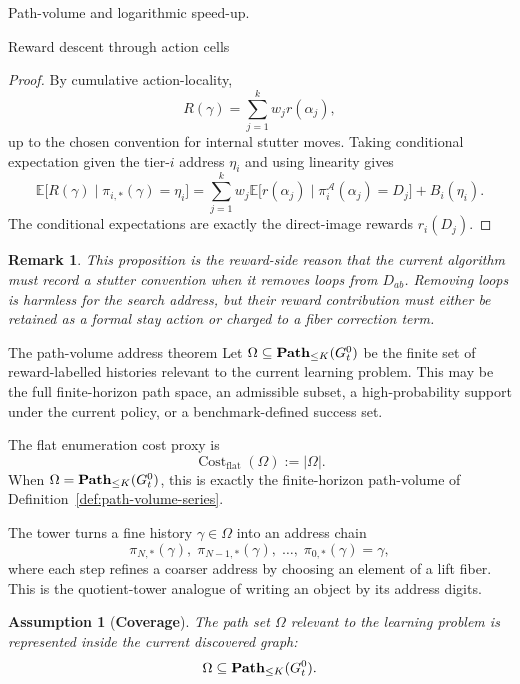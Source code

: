 \documentclass[11pt]{article}
\newtheorem{assumption}[subsubsection]{Assumption}
\newtheorem{remark}[subsubsection]{Remark}
\newcommand{\E}{\mathbb{E}}
\newcommand{\cost}{\operatorname{Cost}}
\begin{document}
\begin{section}{Path-volume and logarithmic speed-up.}
\begin{subsection}{Reward descent through action cells}
\begin{proof}
By cumulative action-locality,
$$
R(\gamma)=\sum_{j=1}^{k}w_jr(\alpha_j),
$$
up to the chosen convention for internal stutter moves. Taking conditional expectation given the tier-$i$ address $\eta_i$ and using linearity gives
$$
\E\bigl[R(\gamma)\mid \pi_{i,*}(\gamma)=\eta_i\bigr]
=
\sum_{j=1}^{k}w_j
\E\bigl[r(\alpha_j)\mid \pi_i^{\mathcal A}(\alpha_j)=D_j\bigr]
+B_i(\eta_i).
$$
The conditional expectations are exactly the direct-image rewards $r_i(D_j)$.
\end{proof}

\begin{remark}
\normalfont
This proposition is the reward-side reason that the current algorithm must record a stutter convention when it removes loops from $D_{ab}$. Removing loops is harmless for the search address, but their reward contribution must either be retained as a formal stay action or charged to a fiber correction term.
\end{remark}

\end{subsection}

\begin{subsection}{The path-volume address theorem}
\label{thm:path-volume-address}
Let
$
\Omega\subseteq\bold{Path}_{\le K}(G_t^0)
$
be the finite set of reward-labelled histories relevant to the current learning problem. This may be the full finite-horizon path space, an admissible subset, a high-probability support under the current policy, or a benchmark-defined success set.

The flat enumeration cost proxy is
$$
\cost_{\mathrm{flat}}(\Omega):=|\Omega|.
$$
When $\Omega=\bold{Path}_{\le K}(G_t^0)$, this is exactly the finite-horizon path-volume of Definition~\ref{def:path-volume-series}.

The tower turns a fine history $\gamma\in\Omega$ into an address chain
$$
\pi_{N,*}(\gamma),\;
\pi_{N-1,*}(\gamma),\;
\ldots,\;
\pi_{0,*}(\gamma)=\gamma,
$$
where each step refines a coarser address by choosing an element of a lift fiber. This is the quotient-tower analogue of writing an object by its address digits.

\begin{assumption}[{\bf Coverage}]\label{ass:path-volume-coverage}
\normalfont
The path set $\Omega$ relevant to the learning problem is represented inside the current discovered graph:
$$
\Omega\subseteq\bold{Path}_{\le K}(G_t^0).
$$
\end{assumption}


\end{subsection}
\end{section}
\end{document}
